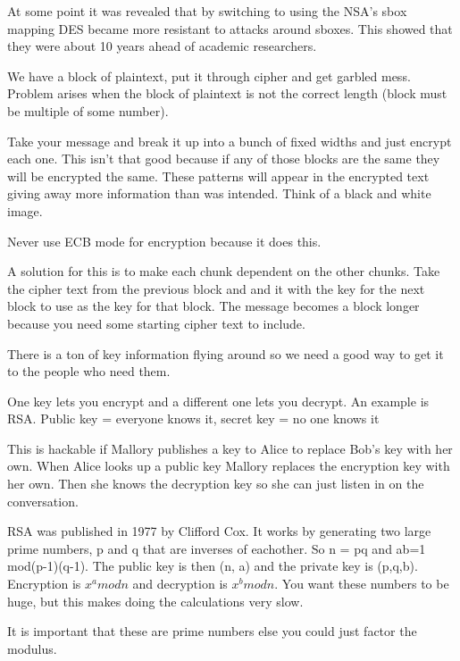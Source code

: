 \documentclass{article}
\begin{document}
At some point it was revealed that by switching to using the NSA's sbox mapping DES became more resistant to attacks around sboxes. This showed that they were about 10 years ahead of academic researchers.


We have a block of plaintext, put it through cipher and get garbled mess. Problem arises when the block of plaintext is not the correct length (block must be multiple of some number). 


Take your message and break it up into a bunch of fixed widths and just encrypt each one. This isn't that good because if any of those blocks are the same they will be encrypted the same. These patterns will appear in the encrypted text giving away more information than was intended. Think of a black and white image.

Never use ECB mode for encryption because it does this.


A solution for this is to make each chunk dependent on the other chunks. Take the cipher text from the previous block and and it with the key for the next block to use as the key for that block. The message becomes a block longer because you need some starting cipher text to include.


There is a ton of key information flying around so we need a good way to get it to the people who need them.



One key lets you encrypt and a different one lets you decrypt. An example is RSA. Public key = everyone knows it, secret key = no one knows it


This is hackable if Mallory publishes a key to Alice to replace Bob's key with her own. When Alice looks up a public key Mallory replaces the encryption key with her own. Then she knows the decryption key so she can just listen in on the conversation. 

RSA was published in 1977 by Clifford Cox. It works by generating two large prime numbers, p and q that are inverses of eachother. So n = pq and ab=1 mod(p-1)(q-1). The public key is then (n, a) and the private key is (p,q,b). Encryption is $x^a mod n$ and decryption is $x^b mod n$. You want these numbers to be huge, but this makes doing the calculations very slow.

It is important that these are prime numbers else you could just factor the modulus.
\end{document}
